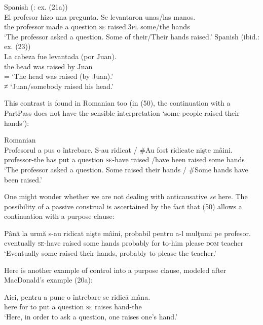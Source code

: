 \documentclass[output=paper]{langsci/langscibook}
\begin{document}
\ea%
    \label{ex:giurgea:49}
    \ea Spanish (\citealt{MacDonald2017}: ex. (21a))\\
    \gll El   profesor   hizo   una pregunta. Se  levantaron unas/las   manos. \\
         the professor  made a      question  \textsc{se}  raised.\textsc{3pl}  some/the hands         \\
    \glt ‘The professor asked a question. Some of their/Their hands raised.’
    \ex   Spanish (ibid.: ex. (23))\\
    \gll La cabeza fue levantada (por Juan).    \\
         the head   was raised        by  Juan\\
    \glt = ‘The head was raised (by Juan).’\\
         ≠ ‘Juan/somebody raised his head.’
\z
\z

This contrast is found in Romanian too (in (50), the continuation with a PartPass does not have the sensible interpretation ‘some people raised their hands’):

\ea%
    Romanian\label{ex:giurgea:50}\\
    \gll Profesorul      a   pus o întrebare. S-au     ridicat / \#Au   fost   ridicate nişte mâini.\\
         professor-the has put a question  \textsc{se-}have raised  /have  been raised   some hands\\
    \glt ‘The professor asked a question. Some raised their hands / \#Some hands have been raised.’
\z

One might wonder whether we are not dealing with anticausative \textit{se} here. The possibility of a passive construal is ascertained by the fact that (50) allows a continuation with a purpose clause:   

\ea%
    \label{ex:giurgea:51}
    \gll Până la urmă s-au     ridicat nişte mâini,  probabil  pentru a-l      mulţumi  pe   profesor.\\
         eventually     \textsc{se}{}-have raised some hands probably for      to-him please    \textsc{dom} teacher\\
    \glt ‘Eventually some raised their hands, probably to please the teacher.’
\z

Here is another example of control into a purpose clause, modeled after MacDonald’s example (20a): 

\ea%
    \label{ex:giurgea:52}
    \gll Aici, pentru a pune o întrebare se ridică mâna.   \\
         here  for     to put   a question  \textsc{se} raises hand-the\\
    \glt ‘Here, in order to ask a question, one raises one’s hand.’
\z
\end{document}
